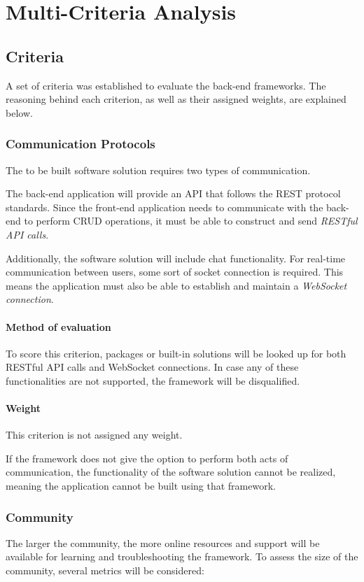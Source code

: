 \section{Multi-Criteria Analysis}\label{sec:multi-criteria-analysis}

\subsection{Criteria}\label{subsec:criteria}
A set of criteria was established to evaluate the back-end frameworks.
The reasoning behind each criterion, as well as their assigned weights, are explained below.

\subsubsection{Communication Protocols}\label{subsubsec:communication-protocols}
The to be built software solution requires two types of communication.

The back-end application will provide an API that follows the REST protocol standards.
Since the front-end application needs to communicate with the back-end to perform CRUD operations, it must be able to construct and send \emph{RESTful API calls}.

Additionally, the software solution will include chat functionality.
For real-time communication between users, some sort of socket connection is required.
This means the application must also be able to establish and maintain a \emph{WebSocket connection}.

\paragraph{Method of evaluation}
To score this criterion, packages or built-in solutions will be looked up for both RESTful API calls and WebSocket connections.
In case any of these functionalities are not supported, the framework will be disqualified.

\paragraph{Weight}
This criterion is not assigned any weight.

If the framework does not give the option to perform both acts of communication, the functionality of the software solution cannot be realized, meaning the application cannot be built using that framework.

\subsubsection{Community}\label{subsubsec:community}
The larger the community, the more online resources and support will be available for learning and troubleshooting the framework.
To assess the size of the community, several metrics will be considered:

